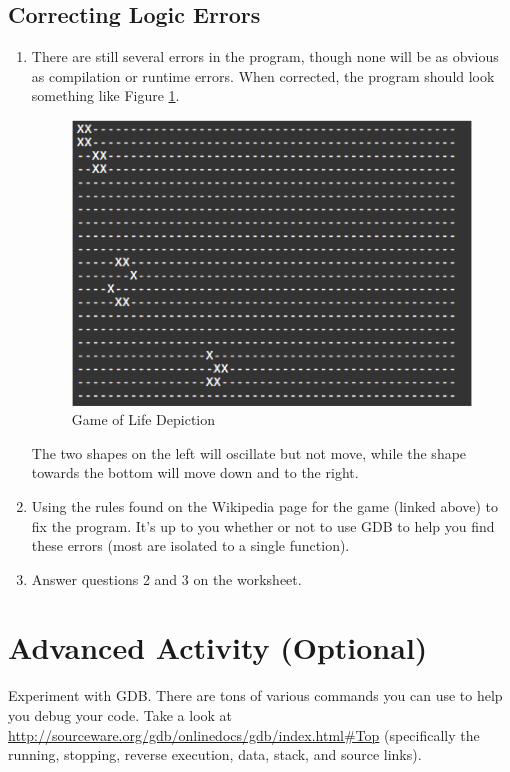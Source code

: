 \documentclass[12pt]{scrartcl}
\begin{document}
\subsection{Correcting Logic Errors}

\begin{enumerate}
  \item There are still several errors in the program, though none will be as 
  	obvious as compilation or runtime errors.  When corrected, the program 
	should look something like Figure \ref{fig:gameOfLife}.
\begin{figure}
\centering
\includegraphics[scale=1.0]{gameOfLife}
\caption{Game of Life Depiction}
\label{fig:gameOfLife}
\end{figure}
	The two shapes on the left will oscillate but not move, while the shape 
	towards the bottom will move down and to the right.
  \item Using the rules found on the Wikipedia page for the game (linked above) to 
  	fix the program.  It's up to you whether or not to use GDB to help you find these 
	errors (most are isolated to a single function).
  \item Answer questions 2 and 3 on the worksheet.  
\end{enumerate}

\section{Advanced Activity (Optional)}

Experiment with GDB.  There are tons of various commands you can use 
to help you debug your code.  Take a look at \url{http://sourceware.org/gdb/onlinedocs/gdb/index.html#Top} 
(specifically the running, stopping, reverse execution, data, stack, and 
source links).  
\end{document}

